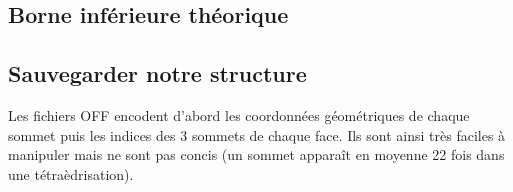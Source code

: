 \documentclass[a4paper,11pt,openany]{article}
\begin{document}
% 
% 


\subsection{Borne inférieure théorique}

\subsection{Sauvegarder notre structure}
\noindent
Les fichiers OFF encodent d'abord les coordonnées géométriques de chaque sommet puis les indices des 3 sommets de chaque face. Ils sont ainsi très faciles à manipuler mais ne sont pas concis (un sommet apparaît en moyenne 22 fois dans une tétraèdrisation).
\end{document}
